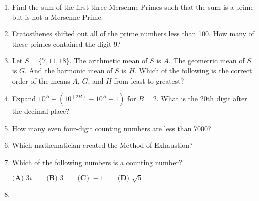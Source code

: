 \documentclass[../uilmath.tex]{subfiles}
\begin{document}
\begin{enumerate}[label=\bfseries\arabic*.]
    \item %
    Find the sum of the first three Mersenne Primes such that the sum is a prime but is not a Mersenne Prime.

    \item %
    Eratosthenes shifted out all of the prime numbers less than 100. How many of these primes contained the digit 9?

    \item %
    Let $S=\{7,11,18\}$. The arithmetic mean of $S$ is $A$. The geometric mean of $S$ is $G$. And the harmonic mean of $S$ is $H$.
    Which of the following is the correct order of the means $A$, $G$, and $H$ from least to greatest?

    \item %
    Expand $10^B \div (10^{(2B)}-10^B-1)$ for $B=2$. What is the 20th digit after the decimal place?

    \item %
    How many even four-digit counting numbers are less than 7000?

    \item %
    Which mathematician created the Method of Exhaustion?

    \item %
    Which of the following numbers is a counting number?

    $\textbf{(A) } 3i \qquad \textbf{(B) } 3 \qquad \textbf{(C) } -1 \qquad \textbf{(D) } \sqrt{5}$

    \item %
    

\end{enumerate}
\end{document}
